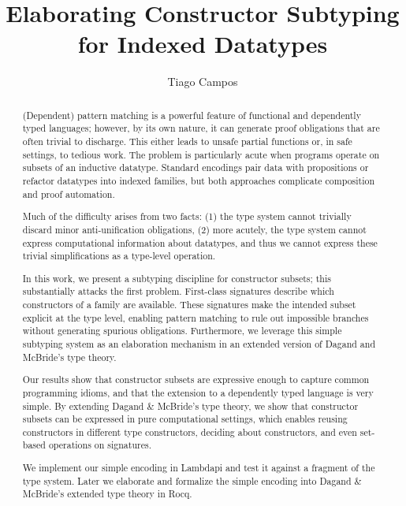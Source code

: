 \documentclass[a4paper, anonymous, UKenglish,cleveref, autoref, thm-restate]{lipics-v2021}
\title{Elaborating Constructor Subtyping for Indexed Datatypes}
\author{Tiago Campos}{UFMG, Brazil}{camposferreiratiago@gmail.com}{https://orcid.org/0000-0002-1825-0097}{}
\begin{document}
\maketitle

\begin{abstract}
(Dependent) pattern matching is a powerful feature of functional and dependently typed languages; 
however, by its own nature, it can generate proof obligations that are often trivial to discharge. 
This either leads to unsafe partial functions or, in safe settings, to tedious work.
The problem is particularly acute when programs operate on subsets of an inductive datatype.
Standard encodings pair data with propositions or refactor datatypes into indexed families, but both approaches complicate composition and proof automation.

Much of the difficulty arises from two facts: 
(1) the type system cannot trivially discard minor anti-unification obligations, 
(2) more acutely, the type system cannot express computational information about datatypes, and thus we cannot express these trivial simplifications as a type-level operation.

In this work, we present a subtyping discipline for constructor subsets; this substantially attacks the first problem. 
First-class signatures describe which constructors of a family are available. These signatures make the intended subset explicit at the type level, enabling pattern matching to rule out impossible branches without generating spurious obligations. 
Furthermore, we leverage this simple subtyping system as an elaboration mechanism in an extended version of Dagand and McBride's type theory.

Our results show that constructor subsets are expressive enough to capture common programming idioms, and that the extension to a dependently typed language is very simple.
By extending Dagand \& McBride's type theory, we show that constructor subsets can be expressed in pure computational settings, 
which enables reusing constructors in different type constructors, deciding about constructors, and even set-based operations on signatures.

We implement our simple encoding in Lambdapi and test it against a fragment of the type system.
Later we elaborate and formalize the simple encoding into Dagand \& McBride's extended type theory in Rocq.

\end{abstract}
\end{document}
